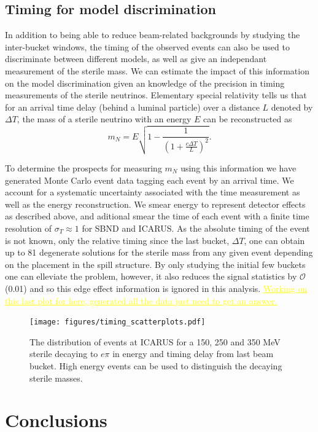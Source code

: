 \documentclass[11pt, a4paper]{article}
\newcommand{\newtext}[2]{\textcolor{#1}{\ul{#2}}}
\begin{document}
\subsection{\label{sec:timing_physics}Timing for model discrimination}
In addition to being able to reduce beam-related backgrounds by studying the inter-bucket windows, the timing of the observed events can also be used to discriminate between different models, as well as give an independant measurement of the sterile mass.  
We can estimate the impact of this information on the model discrimination
given an knowledge of the precision in timing measurements of the sterile
neutrinos. Elementary special relativity tells us that for an arrival time delay (behind a luminal particle) over a distance $L$ denoted by $\Delta T$, the mass of a sterile neutrino with an energy $E$ can be reconstructed as 
%
%
\[ m_N = E\sqrt{1-\frac{1}{\left(1+\frac{c\Delta T}{L}\right)^2}}. \]

To determine the prospects for measuring $m_N$ using this information we
have generated Monte Carlo event data tagging each event by an arrival time.
We account for a systematic uncertainty associated with the time measurement as
well as the energy reconstruction. We smear energy to represent detector effects as described above, and aditional smear the time of each event with a finite time resolution of $\sigma_T  \approx 1$ for SBND and ICARUS. As the absolute timing of the event is not known, only the relative timing since the last bucket, $\Delta T$, one can obtain up to 81 degenerate solutions for the sterile mass from any given event depending on the placement in the spill structure. By only studying the initial few buckets one can elleviate the problem, however, it also reduces the signal statistics by $\mathcal{O}$(0.01) and so this edge effect information is ignored in this analysis.
\newtext{MARK}{Working on this last plot for here, generated all the data just need to get an answer.}
\begin{figure}[t]
\center
\texttt{[image: figures/timing\_scatterplots.pdf]}
\caption{\label{fig:tof_scatter} The distribution of events at ICARUS for a 150, 250 and 350 MeV sterile decaying to $e \pi$ in energy and timing delay from last beam bucket. High energy events can be used to distinguish the decaying sterile masses.}
\end{figure}


\section{Conclusions}
\end{document}
